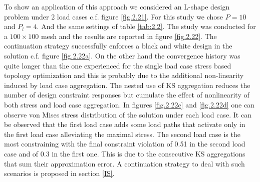 To show an application of this approach we considered an L-shape design problem under 2 load cases c.f. figure \ref{fig.2.21}.
For this study we chose $P=10$ and $P_l=4$. And the same settings of table \ref{tab:2.2}. The study was conducted for a $100\times100$ mesh and the results are reported in figure \ref{fig.2.22}. The continuation strategy successfully enforces a black and white design in the solution c.f. figure \ref{fig.2.22a}. On the other hand the convergence history was quite longer than the one experienced for the single load case stress based topology optimization and this is probably due to the additional non-linearity induced by load case aggregation. The nested use of KS aggregation reduces the number of design constraint responses but cumulate the effect of nonlinearity of both stress and load case aggregation. In figures \ref{fig.2.22c}  and \ref{fig.2.22d} one can observe von Mises stress distribution of the solution under each load case. It can be observed that the first load case adds some load paths that activate only in the first load case alleviating the maximal stress.
The second load case is the most constraining with the final constraint violation of 0.51 in the second load case and of 0.3 in the first one. This is due to the consecutive KS aggregations that sum their approximation error. A continuation strategy to deal with such scenarios is proposed in section \ref{IS}.


